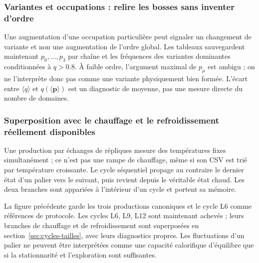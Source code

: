 \subsubsection{Variantes et occupations : relire les bosses sans inventer d’ordre}


Une augmentation d’une occupation particulière peut signaler un changement de variante et non une augmentation de l’ordre global. Les tableaux sauvegardent maintenant $p_0,\ldots,p_3$ par chaîne et les fréquences des variantes dominantes conditionnées à $q>0.8$. À faible ordre, l’argument maximal de $p_\mu$ est ambigu ; on ne l’interprète donc pas comme une variante physiquement bien formée. L’écart entre $\langle q\rangle$ et $q(\langle\mathbf p\rangle)$ est un diagnostic de moyenne, pas une mesure directe du nombre de domaines.

\subsubsection{Superposition avec le chauffage et le refroidissement réellement disponibles}


Une production par échanges de répliques mesure des températures fixes simultanément ; ce n’est pas une rampe de chauffage, même si son CSV est trié par température croissante. Le cycle séquentiel propage au contraire le dernier état d’un palier vers le suivant, puis revient depuis le véritable état chaud. Les deux branches sont appariées à l’intérieur d’un cycle et portent sa mémoire.

La figure précédente garde les trois productions canoniques et le cycle L6 comme références de protocole. Les cycles L6, L9, L12 sont maintenant achevés ; leurs branches de chauffage et de refroidissement sont superposées en section~\ref{sec:cycles-tailles}, avec leurs diagnostics propres. Les fluctuations d’un palier ne peuvent être interprétées comme une capacité calorifique d’équilibre que si la stationnarité et l’exploration sont suffisantes.

